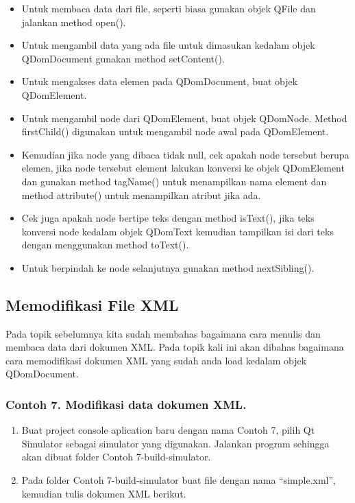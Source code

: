 \begin{itemize}
\tightlist
\item
  Untuk membaca data dari file, seperti biasa gunakan objek QFile dan
  jalankan method open().
\item
  Untuk mengambil data yang ada file untuk dimasukan kedalam objek
  QDomDocument gunakan method setContent().
\item
  Untuk mengakses data elemen pada QDomDocument, buat objek QDomElement.
\item
  Untuk mengambil node dari QDomElement, buat objek QDomNode. Method
  firstChild() digunakan untuk mengambil node awal pada QDomElement.
\item
  Kemudian jika node yang dibaca tidak null, cek apakah node tersebut
  berupa elemen, jika node tersebut element lakukan konversi ke objek
  QDomElement dan gunakan method tagName() untuk menampilkan nama
  element dan method attribute() untuk menampilkan atribut jika ada.
\item
  Cek juga apakah node bertipe teks dengan method isText(), jika teks
  konversi node kedalam objek QDomText kemudian tampilkan isi dari teks
  dengan menggunakan method toText().
\item
  Untuk berpindah ke node selanjutnya gunakan method nextSibling().
\end{itemize}

\subsection{Memodifikasi File XML}\label{memodifikasi-file-xml}

Pada topik sebelumnya kita sudah membahas bagaimana cara menulis dan
membaca data dari dokumen XML. Pada topik kali ini akan dibahas
bagaimana cara memodifikasi dokumen XML yang sudah anda load kedalam
objek QDomDocument.

\subsubsection*{Contoh 7. Modifikasi data dokumen XML.}

\begin{enumerate}
\def\labelenumi{\arabic{enumi}.}
\tightlist
\item
  Buat project console aplication baru dengan nama Contoh 7, pilih Qt
  Simulator sebagai simulator yang digunakan. Jalankan program sehingga
  akan dibuat folder Contoh 7-build-simulator.
\item
  Pada folder Contoh 7-build-simulator buat file dengan nama
  ``simple.xml'', kemudian tulis dokumen XML berikut.
\end{enumerate}

